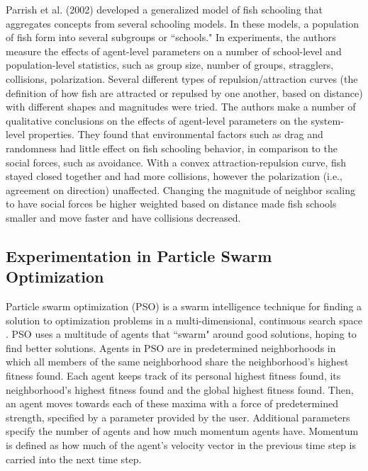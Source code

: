 Parrish et al. (2002)\nocite{parrish2002sof} developed a generalized model of fish schooling that aggregates concepts from several schooling models.
In these models, a population of fish form into several subgroups or ``schools."
In experiments, the authors measure the effects of agent-level parameters on a number of school-level and population-level statistics, such as group size, number of groups, stragglers, collisions, polarization.
Several different types of repulsion/attraction curves (the definition of how fish are attracted or repulsed by one another, based on distance) with different shapes and magnitudes were tried.
The authors make a number of qualitative conclusions on the effects of agent-level parameters on the system-level properties.
They found that environmental factors such as drag and randomness had little effect on fish schooling behavior, in comparison to the social forces, such as avoidance.
With a convex attraction-repulsion curve, fish stayed closed together and had more collisions, however the polarization (i.e., agreement on direction) unaffected.
Changing the magnitude of neighbor scaling to have social forces be higher weighted based on distance made fish schools smaller and move faster and have collisions decreased.


\subsection{Experimentation in Particle Swarm Optimization}

Particle swarm optimization (PSO) is a swarm intelligence technique for finding a solution to optimization problems in a multi-dimensional, continuous search space \cite{kennedy1995pso}.
PSO uses a multitude of agents that ``swarm" around good solutions, hoping to find better solutions.
Agents in PSO are in predetermined neighborhoods in which all members of the same neighborhood share the neighborhood's highest fitness found.
Each agent keeps track of its personal highest fitness found, its neighborhood's highest fitness found and the global highest fitness found.
Then, an agent moves towards each of these maxima with a force of predetermined strength, specified by a parameter provided by the user.
Additional parameters specify the number of agents and how much momentum agents have.
Momentum is defined as how much of the agent's velocity vector in the previous time step is carried into the next time step.

